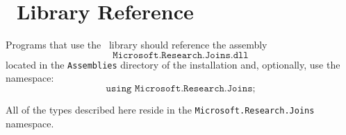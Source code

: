 
\section{\joins\ Library Reference}
\label{joinsref}

Programs that use the \joins\ library should reference the assembly
\[ \texttt{Microsoft.Research.Joins.dll} \]
located in the \texttt{Assemblies} directory of the installation and, optionally, use the namespace:
\[ \texttt{using Microsoft.Research.Joins;} \]

All of the types described here reside in the \texttt{Microsoft.Research.Joins} namespace.





